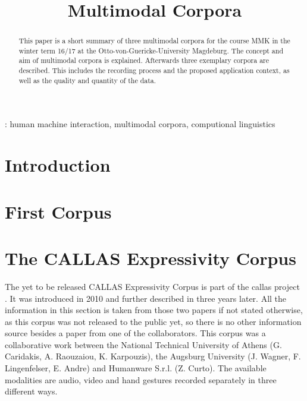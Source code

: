 \documentclass[a4paper]{article}
\title{Multimodal Corpora}
\begin{document}
	\maketitle
  	\begin{abstract}
    	This paper is a short summary of three multimodal corpora for the course MMK in the winter term 16/17 at the Otto-von-Guericke-University Magdeburg. The concept and aim of multimodal corpora is explained. Afterwards three exemplary corpora are described. This includes the recording process and the proposed application context, as well as the quality and quantity of the data.
  	\end{abstract}
  	: human machine interaction, multimodal corpora, computional linguistics
  	
	
  	\section{Introduction}


	\section{First Corpus}
	
	
	\section{The CALLAS Expressivity Corpus}
		The yet to be released CALLAS Expressivity Corpus is part of the \gls{callas} project \cite{2010MultimodalCorpusForGestureExpressivity}. It was introduced in 2010 \cite{2010MultimodalCorpusForGestureExpressivity} and further described in \cite{Caridakis2013} three years later. All the information in this section is taken from those two papers if not stated otherwise, as this corpus was not released to the public yet, so there is no other information source besides a paper from one of the collaborators\cite{wagner:2011:1}. This corpus was a collaborative work between the National Technical University of Athens (G. Caridakis, A. Raouzaiou, K. Karpouzis), the Augsburg University (J. Wagner, F. Lingenfelser, E. Andre) and Humanware S.r.l. (Z. Curto). The available modalities are audio, video and hand gestures recorded separately in three different ways. 
\end{document}
